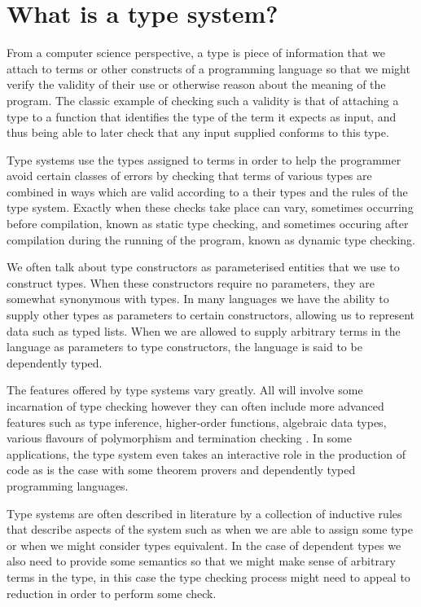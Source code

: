 \chapter{What is a type system?}

From a computer science perspective, a type is piece of information
that we attach to terms or other constructs of a programming language
so that we might verify the validity of their use or otherwise reason
about the meaning of the program. The classic example of checking such
a validity is that of attaching a type to a function that identifies
the type of the term it expects as input, and thus being able to later
check that any input supplied conforms to this type.

Type systems use the types assigned to terms in order to help the
programmer avoid certain classes of errors by checking that terms of
various types are combined in ways which are valid according to a
their types and the rules of the type system. Exactly when these
checks take place can vary, sometimes occurring before compilation,
known as static type checking, and sometimes occuring after
compilation during the running of the program, known as dynamic type
checking.

We often talk about type constructors as parameterised entities that
we use to construct types. When these constructors require no
parameters, they are somewhat synonymous with types. In many languages
we have the ability to supply other types as parameters to certain
constructors, allowing us to represent data such as typed lists. When
we are allowed to supply arbitrary terms in the language as
parameters to type constructors, the language is said to be
dependently typed.

The features offered by type systems vary greatly. All will involve
some incarnation of type checking however they can often include
more advanced features such as type inference, higher-order functions,
algebraic data types, various flavours of polymorphism and termination
checking \cite{Abel_2004}. In some applications, the type system even
takes an interactive role in the production of code as is the case
with some theorem provers and dependently typed programming languages. 

Type systems are often described in literature by a collection of
inductive rules that describe aspects of the system such as when we
are able to assign some type or when we might consider types
equivalent. In the case of dependent types we also need to provide
some semantics so that we might make sense of arbitrary terms in the
type, in this case the type checking process might need to appeal to
reduction in order to perform some check.
